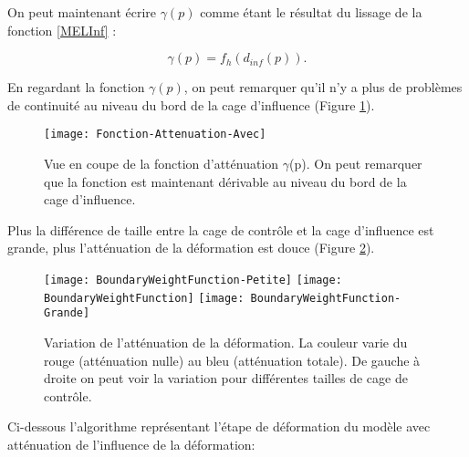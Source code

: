 On peut maintenant écrire $\gamma(p)$ comme étant le résultat du lissage de la
fonction \ref{MELInf} :

\begin{equation}
  \gamma(p) = f_h(d_{inf}(p)).
\end{equation}

En regardant la fonction $\gamma(p)$, on peut remarquer qu'il n'y a plus de
problèmes de continuité au niveau du bord de la cage d'influence (Figure
\ref{MELAtL}).

\begin{figure}[ht]
\begin{center}
\texttt{[image: Fonction-Attenuation-Avec]}

\caption[Fonction d'atténuation $\gamma$(p)] {Vue en coupe de la fonction
d'atténuation $\gamma$(p). On peut remarquer que la fonction est maintenant
dérivable au niveau du bord de la cage d'influence.}

\label{MELAtL}

\end{center}
\end{figure}

Plus la différence de taille entre la cage de contrôle et la cage d'influence
est grande, plus l'atténuation de la déformation est douce (Figure
\ref{MELBou}).

\begin{figure}[ht]
  \begin{center}
    \texttt{[image: BoundaryWeightFunction-Petite]}
    \texttt{[image: BoundaryWeightFunction]}
    \texttt{[image: BoundaryWeightFunction-Grande]}

    \caption[Variation de l'atténuation de la déformation] {Variation de
l'atténuation de la déformation. La couleur varie du rouge (atténuation nulle)
au bleu (atténuation totale). De gauche à droite on peut voir la variation
pour différentes tailles de cage de contrôle.}

    \label{MELBou}
  \end{center}
\end{figure}

Ci-dessous l'algorithme représentant l'étape de déformation du modèle avec
atténuation de l'influence de la déformation: \\

 \\

